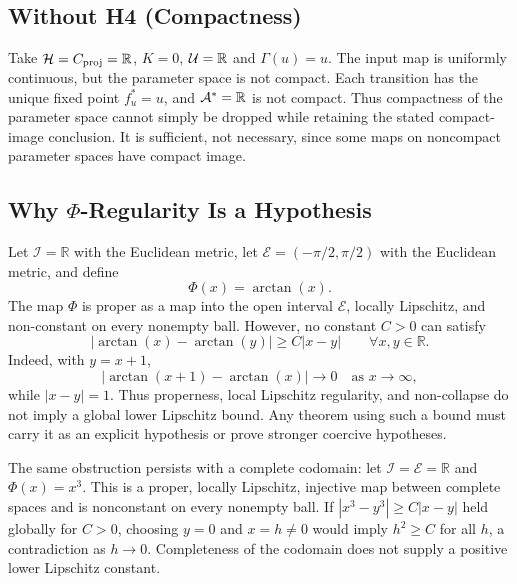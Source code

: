 \subsection{Without H4 (Compactness)}

Take $\mathcal{H}={C_{\mathrm{proj}}}=\mathbb R$, $K=0$, $\mathcal{U}=\mathbb R$ and $\Gamma(u)=u$. The input map is uniformly continuous, but the parameter space is not compact. Each transition has the unique fixed point $f_u^\ast=u$, and $\mathcal{A}^\ast=\mathbb R$ is not compact. Thus compactness of the parameter space cannot simply be dropped while retaining the stated compact-image conclusion. It is sufficient, not necessary, since some maps on noncompact parameter spaces have compact image.

\subsection{\texorpdfstring{Why $\Phi$-Regularity Is a Hypothesis}{Why Phi-Regularity Is a Hypothesis}}\label{app:phi-regularity-counterexample}

Let $\mathcal{I}=\mathbb{R}$ with the Euclidean metric, let $\mathcal{E}=(-\pi/2,\pi/2)$ with the Euclidean metric, and define
\[
\Phi(x)=\arctan(x).
\]
The map $\Phi$ is proper as a map into the open interval $\mathcal{E}$, locally Lipschitz, and non-constant on every nonempty ball. However, no constant $C>0$ can satisfy
\[
|\arctan(x)-\arctan(y)|\geq C|x-y|
\qquad\forall x,y\in\mathbb{R}.
\]
Indeed, with $y=x+1$,
\[
|\arctan(x+1)-\arctan(x)|\to0
\quad\text{as }x\to\infty,
\]
while $|x-y|=1$. Thus properness, local Lipschitz regularity, and non-collapse do not imply a global lower Lipschitz bound. Any theorem using such a bound must carry it as an explicit hypothesis or prove stronger coercive hypotheses.

The same obstruction persists with a complete codomain: let $\mathcal I=\mathcal E=\mathbb R$ and $\Phi(x)=x^3$. This is a proper, locally Lipschitz, injective map between complete spaces and is nonconstant on every nonempty ball. If $|x^3-y^3|\geq C|x-y|$ held globally for $C>0$, choosing $y=0$ and $x=h\neq0$ would imply $h^2\geq C$ for all $h$, a contradiction as $h\to0$. Completeness of the codomain does not supply a positive lower Lipschitz constant.

\nocite{banach,kreyszig,rudin,brezis}
